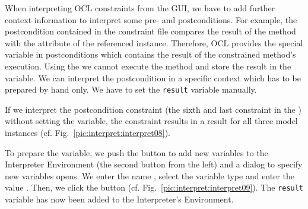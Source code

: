 When interpreting OCL constraints from the GUI, we have to add further context 
information to interpret some pre- and postconditions. For example, the 
postcondition contained in the constraint file compares the result of the 
method  with the attribute  of the referenced
 instance. Therefore, OCL provides the special variable
 in postconditions which contains the result of the constrained
method's execution. Using the  we cannot execute
the method  and store the result in the 
variable. We can interpret the postcondition in a specific context which has to
be prepared by hand only. We have to set the \texttt{result} variable manually.

If we interpret the postcondition constraint (the sixth and last constraint in 
the ) without setting the  variable, the 
constraint results in a  result for all three model instances
(cf. Fig.~\ref{pic:interpret:interpret08}).

To prepare the variable, we push the button to add new variables to the 
Interpreter Environment (the second button from the left) and a dialog to
specify new variables opens. We enter the name , select the
variable type  and enter the value . Then, we click
the  button (cf. Fig.~\ref{pic:interpret:interpret09}). The
\texttt{result} variable has now been added to the Interpreter's Environment.

